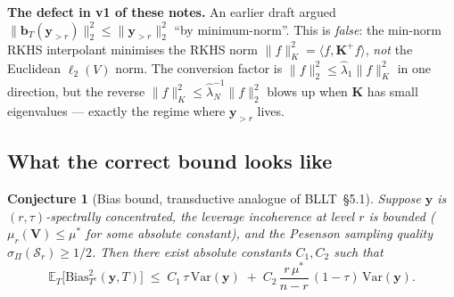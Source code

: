 \documentclass[11pt,a4paper]{article}
\theoremstyle{plain}
\newtheorem{conjecture}[theorem]{Conjecture}
\theoremstyle{definition}
\theoremstyle{remark}
\newcommand{\by}{\mathbf{y}}
\newcommand{\bK}{\mathbf{K}}
\newcommand{\bV}{\mathbf{V}}
\newcommand{\bb}{\mathbf{b}}
\newcommand{\E}{\mathbb{E}}
\newcommand{\Var}{\mathrm{Var}}
\newcommand{\Scal}{\mathcal{S}}
\begin{document}
\textbf{The defect in v1 of these notes.}  An earlier draft argued
$\|\bb_T(\by_{>r})\|_2^2 \le \|\by_{>r}\|_2^2$ ``by minimum-norm''.
This is \emph{false}: the min-norm RKHS interpolant minimises the
RKHS norm $\|f\|_K^2 = \langle f, \bK^+f\rangle$, \emph{not} the
Euclidean $\ell_2(V)$ norm. The conversion factor is
$\|f\|_2^2 \le \hat\lambda_1 \|f\|_K^2$ in one direction, but the
reverse $\|f\|_K^2 \le \hat\lambda_N^{-1}\|f\|_2^2$ blows up when
$\bK$ has small eigenvalues --- exactly the regime where $\by_{>r}$
lives.

\subsection{What the correct bound looks like}

\begin{conjecture}[Bias bound, transductive analogue of BLLT~\S5.1]
\label{conj:bias}
Suppose $\by$ is $(r, \tau)$-spectrally concentrated, the leverage
incoherence at level $r$ is bounded ($\mu_r(\bV) \le \mu^*$ for some
absolute constant), and the Pesenson sampling quality
$\sigma_\Pi(\Scal_r) \ge 1/2$. Then there exist absolute constants
$C_1, C_2$ such that
\begin{equation}
    \E_T\!\big[\mathrm{Bias}_{T^c}^2(\by, T)\big]
    \;\le\; C_1\,\tau\,\Var(\by)
        \;+\; C_2\,\frac{r\,\mu^*}{n - r}\,(1 - \tau)\,\Var(\by).
    \label{eq:bias-conjecture}
\end{equation}
\end{conjecture}
\end{document}
